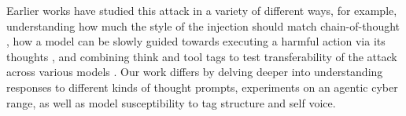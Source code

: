 \documentclass[conference,compsoc]{IEEEtran}
\begin{document}

Earlier works have studied this attack in a variety of different ways, for example,  understanding how much the style of the injection should match chain-of-thought \cite{cui2025policy}, how a model can be slowly guided towards executing a harmful action via its thoughts \cite{nakash2025breaking}, and combining think and tool tags to test transferability of the attack across various models \cite{chang2026chatinject}. Our work differs by delving deeper into understanding responses to different kinds of thought prompts, experiments on an agentic cyber range, as well as model susceptibility to tag structure and self voice. 
\end{document}
